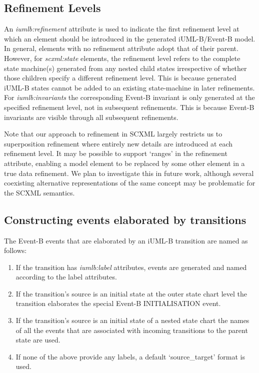 \subsection{Refinement Levels}
An \emph{iumlb:refinement} attribute is used to indicate the first refinement 
level at which an element should be introduced in the generated iUML-B/Event-B model. 
In general, elements with no refinement attribute adopt that of their parent.  
However, for \emph{scxml:state} elements, the refinement level refers to the complete state 
machine(s) generated from any nested child states irrespective of whether 
those children specify a different refinement level. This is because generated 
iUML-B states cannot be added to an existing state-machine in later refinements.
For \emph{iumlb:invariants} the corresponding Event-B invariant is only  generated at the 
specified refinement level, not in  subsequent refinements. This is because Event-B 
invariants are visible through all subsequent refinements.

Note that our approach to refinement in SCXML largely restricts us to superposition 
refinement where entirely new details are introduced at each refinement level.  
It may be possible to support `ranges' in the refinement attribute, enabling a model 
element to be replaced by some other element in a true data refinement. We plan to 
investigate this in future work, although several coexisting alternative 
representations of the same concept may be problematic for the SCXML semantics.

\subsection{Constructing events elaborated by transitions}
The Event-B events that are elaborated by an iUML-B  transition are named as follows:

\vspace{-\topsep}
\begin{enumerate}
  \setlength{\parskip}{0pt}
  \setlength{\itemsep}{0pt plus 1pt}
\item If the transition has \emph{iumlb:label} attributes, events are generated 
and named according to the label attributes.
\item If the transition's source is an initial state at the outer state chart 
level the transition elaborates the special Event-B INITIALISATION event. 
\item If the transition's source is an initial state of a nested state chart 
the names of all the events that are associated with incoming transitions to 
the parent state are used.
\item If none of the above provide any labels, a default  `source\_target' format is used.
\end{enumerate}
\vspace{-\topsep}

